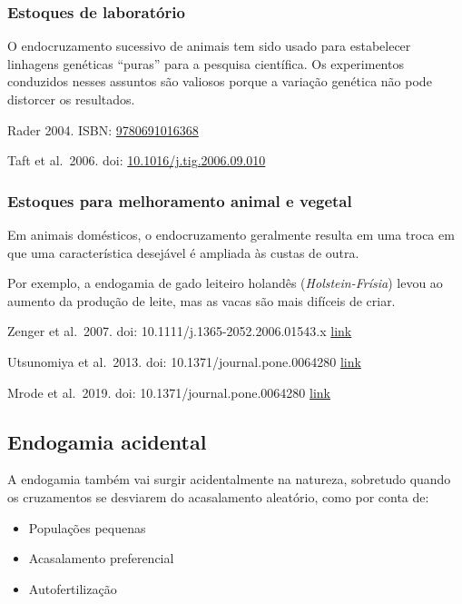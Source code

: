 \documentclass[
]{book}
\begin{document}
\hypertarget{estoques-de-laboratuxf3rio}{%
\subsubsection{Estoques de laboratório}\label{estoques-de-laboratuxf3rio}}

O endocruzamento sucessivo de animais tem sido usado para estabelecer linhagens genéticas ``puras'' para a pesquisa científica. Os experimentos conduzidos nesses assuntos são valiosos porque a variação genética não pode distorcer os resultados.

Rader 2004. ISBN: \href{https://www.goodreads.com/book/show/434281.Making_Mice}{9780691016368}

Taft et al.~2006. doi: \href{https://doii.org/10.1016/j.tig.2006.09.010}{10.1016/j.tig.2006.09.010}

\hypertarget{estoques-para-melhoramento-animal-e-vegetal}{%
\subsubsection{Estoques para melhoramento animal e vegetal}\label{estoques-para-melhoramento-animal-e-vegetal}}

Em animais domésticos, o endocruzamento geralmente resulta em uma troca em que uma característica desejável é ampliada às custas de outra.

Por exemplo, a endogamia de gado leiteiro holandês (\emph{Holstein-Frísia}) levou ao aumento da produção de leite, mas as vacas são mais difíceis de criar.

Zenger et al.~2007. doi: 10.1111/j.1365-2052.2006.01543.x \href{https://doii.org/10.1111/j.1365-2052.2006.01543.x}{link}

Utsunomiya et al.~2013. doi: 10.1371/journal.pone.0064280 \href{https://doii.org/10.1371/journal.pone.0064280}{link}

Mrode et al.~2019. doi: 10.1371/journal.pone.0064280 \href{https://doii.org/10.1371/journal.pone.0064280}{link}

\hypertarget{endogamia-acidental}{%
\subsection{Endogamia acidental}\label{endogamia-acidental}}

A endogamia também vai surgir acidentalmente na natureza, sobretudo quando os cruzamentos se desviarem do acasalamento aleatório, como por conta de:

\begin{itemize}
\item
  Populações pequenas
\item
  Acasalamento preferencial
\item
  Autofertilização
\end{itemize}
\end{document}

